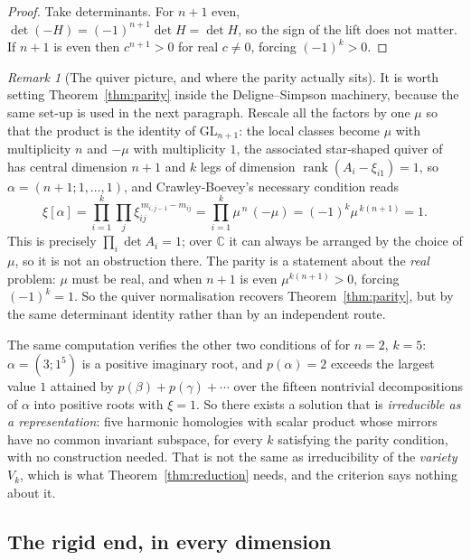 \documentclass[11pt,a4paper]{article}
\theoremstyle{plain}
\theoremstyle{definition}
\theoremstyle{remark}
\newtheorem{remark}[theorem]{Remark}
\begin{document}
\begin{proof}
Take determinants. For $n+1$ even, $\det(-H)=(-1)^{n+1}\det H=\det H$, so the sign
of the lift does not matter. If $n+1$ is even then $c^{n+1}>0$ for real $c\ne0$,
forcing $(-1)^k>0$.
\end{proof}

\begin{remark}[The quiver picture, and where the parity actually sits]
\label{rem:parityquiver}
It is worth setting Theorem~\ref{thm:parity} inside the Deligne--Simpson
machinery, because the same set-up is used in the next paragraph. Rescale all the
factors by one $\mu$ so that the product is the identity of
$\mathrm{GL}_{n+1}$: the local classes become $\mu$ with multiplicity $n$ and
$-\mu$ with multiplicity $1$, the associated star-shaped quiver of
\cite{cb-icm} has central dimension $n+1$ and $k$ legs of dimension
$\operatorname{rank}(A_i-\xi_{i1})=1$, so $\alpha=(n+1;1,\dots,1)$, and
Crawley-Boevey's necessary condition reads
\[
  \xi[\alpha]=\prod_{i=1}^k\prod_{j}\xi_{ij}^{\,m_{i,j-1}-m_{ij}}
  =\prod_{i=1}^k\mu^{\,n}\,(-\mu)
  =(-1)^k\mu^{\,k(n+1)}=1 .
\]
This is precisely $\prod_i\det A_i=1$; over $\mathbb C$ it can always be
arranged by the choice of $\mu$, so it is not an obstruction there. The parity
is a statement about the \emph{real} problem: $\mu$ must be real, and when $n+1$
is even $\mu^{k(n+1)}>0$, forcing $(-1)^k=1$. So the quiver normalisation
recovers Theorem~\ref{thm:parity}, but by the same determinant identity rather
than by an independent route.

The same computation verifies the other two conditions of \cite[Thm.~10]{cb-icm} for
$n=2$, $k=5$: $\alpha=(3;1^5)$ is a positive imaginary root, and
$p(\alpha)=2$ exceeds the largest value $1$ attained by
$p(\beta)+p(\gamma)+\cdots$ over the fifteen nontrivial decompositions of $\alpha$
into positive roots with $\xi=1$. So there exists a solution that is
\emph{irreducible as a representation}: five harmonic homologies with scalar product
whose mirrors have no common invariant subspace, for every $k$ satisfying the parity
condition, with no construction needed. That is not the same as irreducibility of the
\emph{variety} $V_k$, which is what Theorem~\ref{thm:reduction} needs, and the
criterion says nothing about it.
\end{remark}

\subsection{The rigid end, in every dimension}
\end{document}
